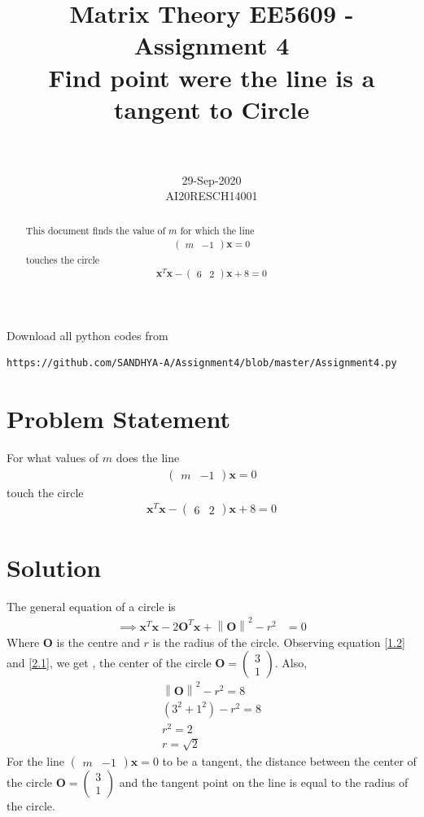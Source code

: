 \documentclass[journal,12pt,twocolumn]{IEEEtran}
\let\vec\mathbf
\newcommand{\myvec}[1]{\ensuremath{\begin{pmatrix}#1\end{pmatrix}}}
\newcommand{\norm}[1]{\left\lVert#1\right\rVert}
\begin{document}
\title{Matrix Theory EE5609 - Assignment 4\\
Find point were the line is a tangent to Circle
}

\author{\\
 \\
29-Sep-2020\\
AI20RESCH14001\\
 }

\maketitle
\begin{abstract}
 This document finds the value of  $m$ for which the line
\begin{align}
\myvec{m &-1}\vec{x}=0
\end{align}
touches the circle
\begin{align}
\vec{x}^T\vec{x}-\myvec{6 & 2}\vec{x}+8 = 0
\end{align}
\end{abstract}

Download all python codes from 
\begin{lstlisting}
https://github.com/SANDHYA-A/Assignment4/blob/master/Assignment4.py
\end{lstlisting}

\section{Problem Statement}
 For what values of $m$ does the line 
\begin{align}
\myvec{m &-1}\vec{x}=0
\end{align}
touch the circle
\begin{align}
\vec{x}^T\vec{x}-\myvec{6 & 2}\vec{x}+8 = 0 \label{1.2}
\end{align}

\section{Solution}
The general equation of a circle is 
\begin{align}
\implies \vec{x}^T\vec{x} - 2\vec{O}^T\vec{x} + \norm{\vec{O}}^2 - r^2  &= 0 \label{2.1}
\end{align}
Where $\vec{O}$ is the centre and $r$ is the radius of the circle.
Observing equation \ref{1.2} and \ref{2.1}, we get ,
the center of the circle $\vec{O}  = \myvec{3 \\ 1}$.
Also, 
\begin{align}
\norm{\vec{O}}^2 - r^2  = 8 \\
(3^2  + 1^2)- r^2  = 8\\
 r^2  = 2\\
r = \sqrt{2}
\end{align}
For the line $\myvec{m &-1}\vec{x}=0$ to be a tangent, the distance between the center of the circle $\vec{O}  = \myvec{3 \\ 1}$  and the tangent point on the line is equal to the radius of the circle.
\end{document}
